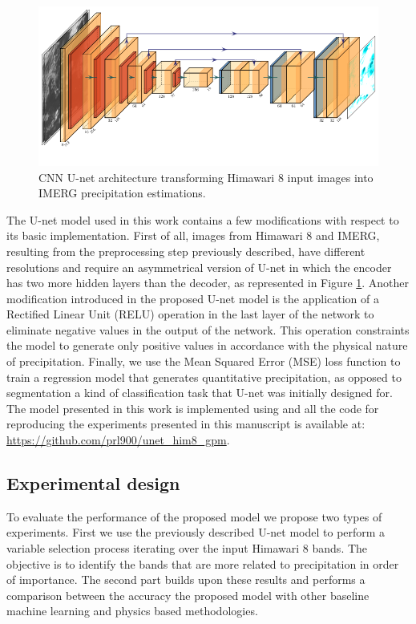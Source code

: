 \documentclass[3p,times]{elsarticle}
\begin{document}
\begin{figure}%
    \includegraphics[width=14cm]{unet.png}
    \caption{CNN U-net architecture transforming Himawari 8 input images into IMERG precipitation estimations.}%
    \label{model_cmp}%
\end{figure}

The U-net model used in this work contains a few modifications with respect to its basic implementation. First of all, images from Himawari 8 and IMERG, resulting from the preprocessing step previously described, have different resolutions and require an asymmetrical version of U-net in which the encoder has two more hidden layers than the decoder, as represented in Figure \ref{model_cmp}. Another modification introduced in the proposed U-net model is the application of a Rectified Linear Unit (RELU) operation in the last layer of the network to eliminate negative values in the output of the network. This operation constraints the model to generate only positive values in accordance with the physical nature of precipitation. Finally, we use the Mean Squared Error (MSE) loss function to train a regression model that generates quantitative precipitation, as opposed to segmentation a kind of classification task that U-net was initially designed for. The model presented in this work is implemented using \citep{chollet2018keras} and all the code for reproducing the experiments presented in this manuscript is available at: \href{https://github.com/prl900/unet_him8_gpm}{https://github.com/prl900/unet\_him8\_gpm}.

\subsection{Experimental design}

To evaluate the performance of the proposed model we propose two types of experiments. First we use the previously described U-net model to perform a variable selection process iterating over the input Himawari 8 bands. The objective is to identify the bands that are more related to precipitation in order of importance. The second part builds upon these results and performs a comparison between the accuracy the proposed model with other baseline machine learning and physics based methodologies.
\end{document}
